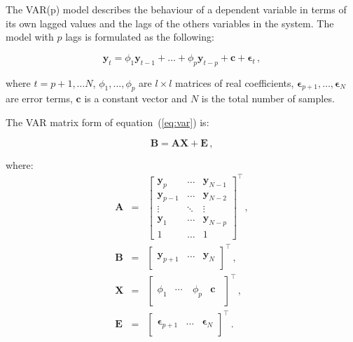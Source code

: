 The VAR(p) model describes the behaviour of a dependent variable in terms
of its own lagged values and the lags of the others variables in the
system. The model with $p$ lags is formulated as the following:

\begin{equation}
\label{eq:var}
 \mathbf{y}_t = \phi_1 \mathbf{y}_{t-1}  + \dots +   \phi_p\mathbf{y}_{t-p}
+ \mathbf{c} + \mathbf{\epsilon}_t \, ,
\end{equation}

\noindent where $t=p+1, \dots N$,  ${\phi_1,\dots,\phi_p}$ are $l \times l$
matrices of real coefficients,
$\mathbf{\epsilon}_{p+1},\dots,\mathbf{\epsilon}_N$ are error terms,
$\mathbf{c}$ is a constant vector and $N$ is the total number of samples.

The VAR matrix form of equation~(\ref{eq:var}) is:

\begin{equation}\label{eq:vareq}
\mathbf{B} = \mathbf{A} \mathbf{X} + 
\mathbf{E} \, , 
\end{equation}

\noindent where:
\begin{eqnarray*}
\mathbf{A} &=&
\begin{bmatrix}
   \mathbf{y}_{p}     & \dots    & \mathbf{y}_{N-1}\\
   \mathbf{y}_{p-1}   & \dots    & \mathbf{y}_{N-2}\\
   \vdots             & \ddots   & \vdots\\
   \mathbf{y}_{1}     & \dots    & \mathbf{y}_{N-p}\\
   1                  & \dots    & 1 
   \end{bmatrix}^\top \, ,\\
\mathbf{B} &=&
\begin{bmatrix}
\quad \\
\mathbf{y}_{p+1} &
\dots & 
\mathbf{y}_N \\
\quad
\end{bmatrix}^\top  \, ,\\
\mathbf{X}&=&
\left[
\begin{array}{ccccc}
    \quad  & \quad & \quad & \quad \\
    \phi_1   & \cdots & \phi_p & \mathbf{c} \\  
    \quad & \quad & \quad & \quad
    \end{array}
\right]^\top \, ,\\
\mathbf{E} &=& 
\begin{bmatrix}
    \quad \\
    \mathbf{\epsilon}_{p+1}  & 
    \dots                & 
    \mathbf{\epsilon}_N \\
    \quad
\end{bmatrix}^\top \, . 
\end{eqnarray*}

